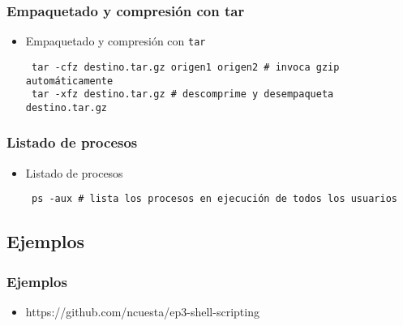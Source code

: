 \begin{frame}[fragile]
  \frametitle{Empaquetado y compresión con tar}
  \begin{itemize}
    \item Empaquetado y compresión con \texttt{tar}
   \begin{lstlisting}
 tar -cfz destino.tar.gz origen1 origen2 # invoca gzip automáticamente
 tar -xfz destino.tar.gz # descomprime y desempaqueta destino.tar.gz
   \end{lstlisting}
  \end{itemize}
\end{frame}

\begin{frame}[fragile]
  \frametitle{Listado de procesos}
  \begin{itemize}
    \item Listado de procesos
   \begin{lstlisting}
 ps -aux # lista los procesos en ejecución de todos los usuarios
   \end{lstlisting}
  \end{itemize}
\end{frame}

\subsection{Ejemplos}

\begin{frame}
  \frametitle{Ejemplos}
  \begin{itemize}
    \item https://github.com/ncuesta/ep3-shell-scripting
  \end{itemize}
\end{frame}
